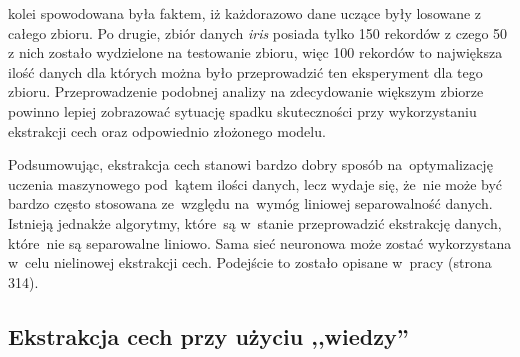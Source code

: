 kolei spowodowana była faktem, iż każdorazowo dane uczące były losowane z całego zbioru. Po drugie, zbiór danych \textit{iris} posiada tylko 150 rekordów z czego 50 z nich zostało wydzielone na testowanie zbioru, więc 100 rekordów to największa ilość danych dla których można było przeprowadzić ten eksperyment dla tego zbioru. Przeprowadzenie podobnej analizy na zdecydowanie większym zbiorze powinno lepiej zobrazować sytuację spadku skuteczności przy wykorzystaniu ekstrakcji cech oraz odpowiednio złożonego modelu. 

Podsumowując, ekstrakcja cech stanowi bardzo dobry sposób na~optymalizację uczenia maszynowego pod~kątem ilości danych, lecz wydaje się, że~nie może być bardzo często stosowana ze~względu na~wymóg liniowej separowalność danych. Istnieją jednakże algorytmy, które~są w~stanie przeprowadzić ekstrakcję danych, które~nie są separowalne liniowo. Sama sieć neuronowa może zostać wykorzystana w~celu nielinowej ekstrakcji cech.  Podejście to zostało opisane w~pracy \cite{bishop1995neural} (strona 314).

\subsection{Ekstrakcja cech przy użyciu ,,wiedzy''}

